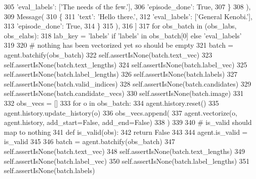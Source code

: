 \begin{DoxyCode}
305                     \textcolor{stringliteral}{'eval\_labels'}: [\textcolor{stringliteral}{'The needs of the few.'}],
306                     \textcolor{stringliteral}{'episode\_done'}: \textcolor{keyword}{True},
307                 \}
308             ),
309             Message(
310                 \{
311                     \textcolor{stringliteral}{'text'}: \textcolor{stringliteral}{'Hello there.'},
312                     \textcolor{stringliteral}{'eval\_labels'}: [\textcolor{stringliteral}{'General Kenobi.'}],
313                     \textcolor{stringliteral}{'episode\_done'}: \textcolor{keyword}{True},
314                 \}
315             ),
316         ]
317         \textcolor{keywordflow}{for} obs\_batch \textcolor{keywordflow}{in} (obs\_labs, obs\_elabs):
318             lab\_key = \textcolor{stringliteral}{'labels'} \textcolor{keywordflow}{if} \textcolor{stringliteral}{'labels'} \textcolor{keywordflow}{in} obs\_batch[0] \textcolor{keywordflow}{else} \textcolor{stringliteral}{'eval\_labels'}
319 
320             \textcolor{comment}{# nothing has been vectorized yet so should be empty}
321             batch = agent.batchify(obs\_batch)
322             self.assertIsNone(batch.text\_vec)
323             self.assertIsNone(batch.text\_lengths)
324             self.assertIsNone(batch.label\_vec)
325             self.assertIsNone(batch.label\_lengths)
326             self.assertIsNone(batch.labels)
327             self.assertIsNone(batch.valid\_indices)
328             self.assertIsNone(batch.candidates)
329             self.assertIsNone(batch.candidate\_vecs)
330             self.assertIsNone(batch.image)
331 
332             obs\_vecs = []
333             \textcolor{keywordflow}{for} o \textcolor{keywordflow}{in} obs\_batch:
334                 agent.history.reset()
335                 agent.history.update\_history(o)
336                 obs\_vecs.append(
337                     agent.vectorize(o, agent.history, add\_start=\textcolor{keyword}{False}, add\_end=\textcolor{keyword}{False})
338                 )
339 
340             \textcolor{comment}{# is\_valid should map to nothing}
341             \textcolor{keyword}{def }is\_valid(obs):
342                 \textcolor{keywordflow}{return} \textcolor{keyword}{False}
343 
344             agent.is\_valid = is\_valid
345 
346             batch = agent.batchify(obs\_batch)
347             self.assertIsNone(batch.text\_vec)
348             self.assertIsNone(batch.text\_lengths)
349             self.assertIsNone(batch.label\_vec)
350             self.assertIsNone(batch.label\_lengths)
351             self.assertIsNone(batch.labels)

\end{DoxyCode}
